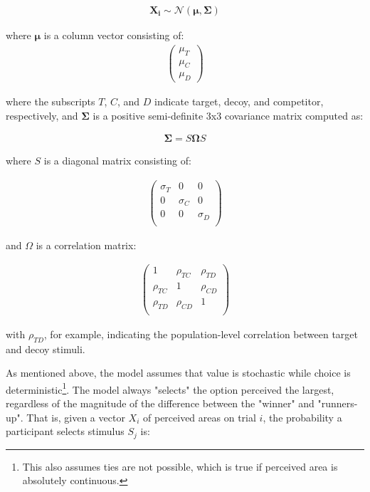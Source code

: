 \documentclass{umassthesis}          %
\begin{document}
\begin{align}
   \mathbf{X_{i}}\sim\mathcal{N}(\mathbf{\mu},\mathbf{\Sigma})
   \label{eqn:mvnorm}
\end{align}

where $\mathbf{\mu}$ is a column vector consisting of:
\begin{align}
   \begin{pmatrix}
      \mu_{T} \\
      \mu_{C} \\
      \mu_{D}
      \end{pmatrix}
   \label{eqn:mu}
\end{align}

where the subscripts $T$, $C$, and $D$ indicate target, decoy, and competitor, respectively, and $\mathbf{\Sigma}$ is a positive semi-definite 3x3 covariance matrix computed as:

\begin{align}
   \mathbf{\Sigma}=S\mathbf{\Omega}S
   \label{eqn:Sigma}
\end{align}

where $S$ is a diagonal matrix consisting of: 

\begin{align}
   \begin{pmatrix}
      \sigma_{T} & 0 & 0 \\
      0 & \sigma_{C} & 0 \\
      0 & 0 & \sigma_{D} \\
   \end{pmatrix}
   \label{eqn:R}
\end{align}

and $\Omega$ is a correlation matrix:

\begin{align}
   \begin{pmatrix}
      1 & \rho_{TC} & \rho_{TD} \\
      \rho_{TC} & 1 & \rho_{CD} \\
      \rho_{TD} & \rho_{CD} & 1 \\
   \end{pmatrix}
   \label{eqn:R}
\end{align}

with $\rho_{TD}$, for example, indicating the population-level correlation between target and decoy stimuli.

As mentioned above, the model assumes that value is stochastic while choice is deterministic\footnote{This also assumes ties are not possible, which is true if perceived area is absolutely continuous.}. The model always "selects" the option perceived the largest, regardless of the magnitude of the difference between the "winner" and "runners-up". That is, given a vector $X_{i}$ of perceived areas on trial $i$, the probability a participant selects stimulus $S_{j}$ is:
\end{document}

